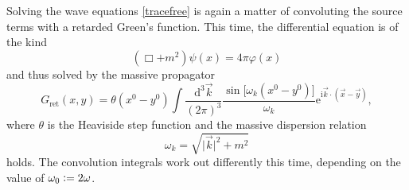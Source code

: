 Solving the wave equations \eqref{tracefree} is again a matter of convoluting the source terms with a retarded Green's function. This time, the differential equation is of the kind
\begin{equation}
  (\Box + m^2)\psi(x) = 4\pi\varphi(x)
\end{equation}
and thus solved by the massive propagator\cite{}
\begin{equation}
  G_\text{ret}(x,y) = \theta(x^0-y^0)\int\frac{\mathrm d^3\vec k}{(2\pi)^3}\frac{\operatorname{sin}\lbrack\omega_k(x^0-y^0)\rbrack}{\omega_k} \mathrm e^{\mathrm i\vec k\cdot(\vec x-\vec y)},
\end{equation}
where $\theta$ is the Heaviside step function and the massive dispersion relation
\begin{equation}
  \omega_k = \sqrt{\lvert\vec k\rvert^2 + m^2}
\end{equation}
holds. The convolution integrals work out differently this time, depending on the value of $\omega_0 \vcentcolon= 2\omega$.
